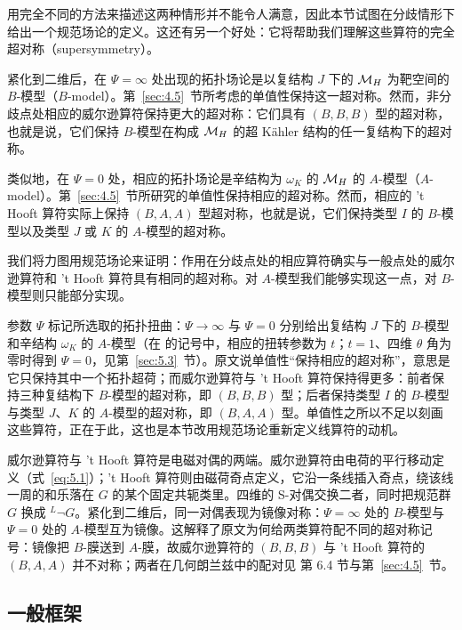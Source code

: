 用完全不同的方法来描述这两种情形并不能令人满意，因此本节试图在分歧情形下给出一个规范场论的定义。这还有另一个好处：它将帮助我们理解这些算符的完全超对称（\mbox{supersymmetry}）。

紧化到二维后，在 $\Psi=\infty$ 处出现的拓扑场论是以复结构 $J$ 下的 ${{\mathcal{M}}_H}$ 为靶空间的 $B$-模型（$B$-model）。第~\ref{sec:4.5}~节所考虑的单值性保持这一超对称。然而，非分歧点处相应的威尔逊算符保持更大的超对称：它们具有 $(B,B,B)$ 型的超对称，也就是说，它们保持 $B$-模型在构成 ${{\mathcal{M}}_H}$ 的超 Kähler 结构的任一复结构下的超对称。

类似地，在 $\Psi=0$ 处，相应的拓扑场论是辛结构为 $\omega_K$ 的 ${{\mathcal{M}}_H}$ 的 $A$-模型（$A$-model）。第~\ref{sec:4.5}~节所研究的单值性保持相应的超对称。然而，相应的 't Hooft 算符实际上保持 $(B,A,A)$ 型超对称，也就是说，它们保持类型 $I$ 的 $B$-模型以及类型 $J$ 或 $K$ 的 $A$-模型的超对称。

我们将力图用规范场论来证明：作用在分歧点处的相应算符确实与一般点处的威尔逊算符和 't Hooft 算符具有相同的超对称。对 $A$-模型我们能够实现这一点，对 $B$-模型则只能部分实现。

\begin{yizhu}[含糊点拨]
参数 $\Psi$ 标记所选取的拓扑扭曲：$\Psi\to\infty$ 与 $\Psi=0$ 分别给出复结构 $J$ 下的 $B$-模型和辛结构 $\omega_K$ 的 $A$-模型（在 \cite{ref8} 的记号中，相应的扭转参数为 $t$；$t=1$、四维 $\theta$ 角为零时得到 $\Psi=0$，见第~\ref{sec:5.3}~节）。原文说单值性“保持相应的超对称”，意思是它只保持其中一个拓扑超荷；而威尔逊算符与 't Hooft 算符保持得更多：前者保持三种复结构下 $B$-模型的超对称，即 $(B,B,B)$ 型；后者保持类型 $I$ 的 $B$-模型与类型 $J$、$K$ 的 $A$-模型的超对称，即 $(B,A,A)$ 型。单值性之所以不足以刻画这些算符，正在于此，这也是本节改用规范场论重新定义线算符的动机。
\end{yizhu}

\begin{yizhu}[物理图像补充]
威尔逊算符与 't Hooft 算符是电磁对偶的两端。威尔逊算符由电荷的平行移动定义（式~\eqref{eq:5.1}）；'t Hooft 算符则由磁荷奇点定义，它沿一条线插入奇点，绕该线一周的和乐落在 $G$ 的某个固定共轭类里。四维的 S-对偶交换二者，同时把规范群 $G$ 换成 $^L\neg G$。紧化到二维后，同一对偶表现为镜像对称：$\Psi=\infty$ 处的 $B$-模型与 $\Psi=0$ 处的 $A$-模型互为镜像。这解释了原文为何给两类算符配不同的超对称记号：镜像把 $B$-膜送到 $A$-膜，故威尔逊算符的 $(B,B,B)$ 与 't Hooft 算符的 $(B,A,A)$ 并不对称；两者在几何朗兰兹中的配对见 \cite{ref8} 第 6.4 节与第~\ref{sec:4.5}~节。
\end{yizhu}

\subsection{一般框架}
\label{sec:5.1}

